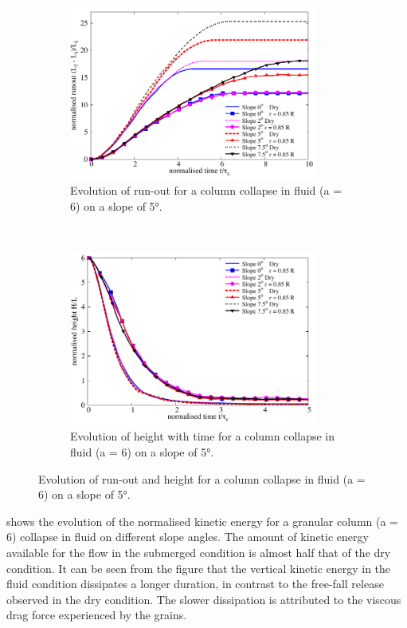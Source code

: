 \begin{figure}
\centering
\begin{subfigure}[t]{0.9\textwidth}
\includegraphics[width=0.9\textwidth]{Runout_a6_slope}
\caption{Evolution of run-out for a column collapse in fluid (a = 6) on a 
slope of 5\si{\degree}.}
\label{fig:Runout_a6_slope}
\end{subfigure} \\
\begin{subfigure}[t]{0.9\textwidth}
\centering
\includegraphics[width=0.9\textwidth]{Height_a6_slope}
\caption{Evolution of height with time for a column collapse in fluid (a = 6) 
on a slope of 5\si{\degree}.}
\label{fig:Height_a6_slope}
\end{subfigure}
\caption{Evolution of  run-out and height  for a column collapse in fluid (a = 
6) on a slope of 5\si{\degree}.}
\label{fig:a6_slope}
\end{figure}

 shows the evolution of the normalised kinetic energy 
for a granular column (a = 6) collapse in fluid on different slope angles. The 
amount of kinetic energy available for the flow in the submerged condition 
is almost half that of the dry condition. It can be seen from the figure that 
the vertical kinetic energy in the fluid condition dissipates a longer 
duration, in contrast to the free-fall release observed in the dry condition. 
The slower dissipation is attributed to the viscous drag force experienced by 
the grains. 

